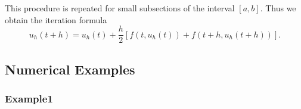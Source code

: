 	\begin{frame}
		This procedure is repeated for small subsections of the interval $[a,b]$. Thus we obtain the iteration formula
		\begin{displaymath}
			u_h (t+h) = u_h(t) +\frac{h}{2}[f(t,u_h(t)) + f(t+h, u_h(t+h))].
		\end{displaymath}
	\end{frame}
	
	\subsection{Numerical Examples}
	
	\subsubsection{Example1}
	
